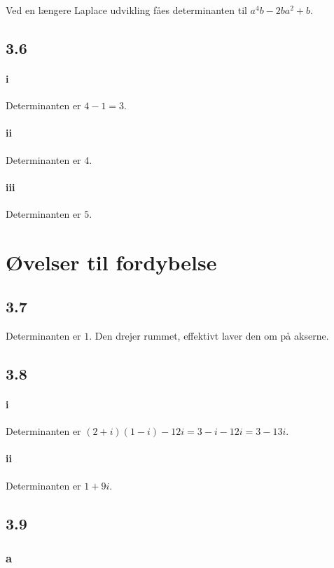 			Ved en længere Laplace udvikling fåes determinanten til $a^4b-2ba^2+b$.

		\subsection{3.6}

			\paragraph{i} Determinanten er $4-1=3$.

			\paragraph{ii} Determinanten er $4$.   

			\paragraph{iii} Determinanten er $5$.   

	\section{Øvelser til fordybelse}

		\subsection{3.7}

			Determinanten er $1$. Den drejer rummet, effektivt laver den om på akserne.

		\subsection{3.8}

			\paragraph{i} Determinanten er $(2+i)(1-i)-12i=3-i-12i=3-13i$.

			\paragraph{ii} Determinanten er $1+9i$.

		\subsection{3.9}

			\subsubsection{a}

